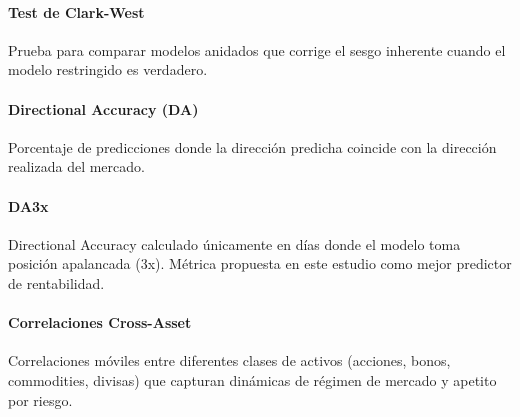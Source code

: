 \documentclass[11pt,a4paper]{article}
\begin{document}
\paragraph{Test de Clark-West} \label{glos:clark-west}
Prueba para comparar modelos anidados que corrige el sesgo inherente cuando el modelo restringido es verdadero.

\paragraph{Directional Accuracy (DA)} \label{glos:da}
Porcentaje de predicciones donde la dirección predicha coincide con la dirección realizada del mercado.

\paragraph{DA3x} \label{glos:da3x}
Directional Accuracy calculado únicamente en días donde el modelo toma posición apalancada (3x). Métrica propuesta en este estudio como mejor predictor de rentabilidad.

\paragraph{Correlaciones Cross-Asset} \label{glos:cross-asset}
Correlaciones móviles entre diferentes clases de activos (acciones, bonos, commodities, divisas) que capturan dinámicas de régimen de mercado y apetito por riesgo.
\end{document}
